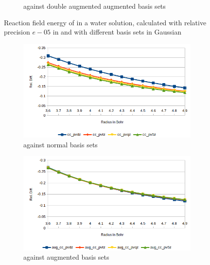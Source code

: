 \documentclass[../Thesis.tex]{subfiles}
\begin{document}
\begin{figure}[h!]
\begin{subfigure}[b]{0.75\linewidth}
    \caption{\mrchem against double augmented augmented basis sets}
  \end{subfigure}
  \caption[Reaction field energy of ]{Reaction field energy of  in a water solution, calculated with relative precision $e-05$ in \mrchem
  and with different basis sets in Gaussian}
  \label{fig:lipEnergyplots}
\end{figure}

\begin{figure}[h!]
  \centering
  \begin{subfigure}[b]{0.75\linewidth}
    \includegraphics[width=\linewidth]{img/watreldiff.png}
    \caption{\mrchem against normal basis sets}
  \end{subfigure}
  \begin{subfigure}[b]{0.75\linewidth}
    \includegraphics[width=\linewidth]{img/wataugreldiff.png}
    \caption{\mrchem against augmented basis sets}
  \end{subfigure}
  \begin{subfigure}[b]{0.75\linewidth}

\end{subfigure}
\end{figure}
\end{document}
